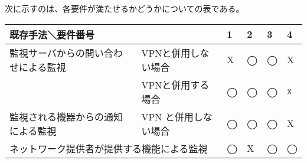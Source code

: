	次に示すのは、各要件が満たせるかどうかについての表である。
	\begin{table}[htb]
	\begin{tabular}{|l|l|l|l|l|l|} \hline
		\multicolumn{2}{|l|}{既存手法＼要件番号} & 
		\multicolumn{1}{|l|}{1} &
		\multicolumn{1}{|l|}{2} &
		\multicolumn{1}{|l|}{3} &
		\multicolumn{1}{|l|}{4} \\ \hline \hline
		監視サーバからの問い合わせによる監視 & VPNと併用しない場合 & X & ◯ & ◯ & X  \\ \cline{2-6}
			& VPNと併用する場合 & ◯ & ◯ & ◯ & ☓ \\ \hline
		監視される機器からの通知による監視 & VPN と併用しない場合 & ◯ & ◯ & ◯ & X \\ \hline
		\multicolumn{2}{|l|}{ネットワーク提供者が提供する機能による監視} & ◯ & X & ◯ & ◯ \\ \hline
	\end{tabular}
	\end{table}
\begin{comment}
	しかし、サーバーからの問い合わせによる監視では、IoT機器が接続するネットワークがプライベートアドレスであった場合に利用できず、
	監視対象機器からの通知による監視では、新たに機器監視サーバをたち上げなくてはならない。
	また、ネットワークの提供者による機器の監視サービスでは、提供ネットワークを利用した機器のリンクアップ・ダウンしか監視することが出来ず、
	VPNを利用した方法では、IoT機器が接続するネットワークのアドレス帯が多様であることから、難しい。
\end{comment}
	
	







